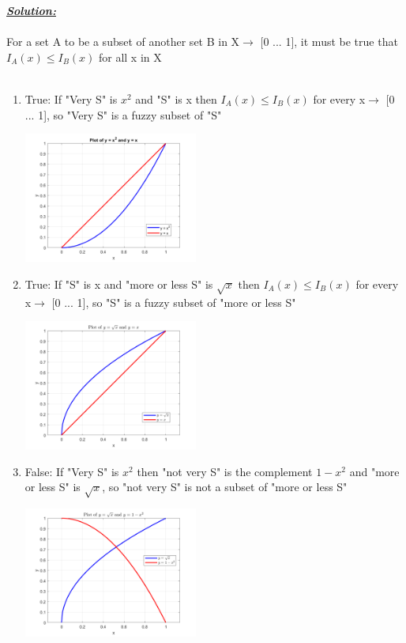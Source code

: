 \documentclass{article}
\begin{document}
\noindent \underline{\textbf{\textit{Solution:}}}
\\ \\For a set A to be a subset of another set B in X${\rightarrow}$ [0 ... 1], it must be true that  ${I_A(x) \leq I_B(x)}$  for all x in X\\ \\
\begin{enumerate}
  \item True: If "Very S" is ${x^2}$ and "S" is x then ${I_A(x) \leq I_B(x)}$ for every x${\rightarrow}$ [0 ... 1], so "Very S" is a fuzzy subset of "S"
  \\ \begin{center} \includegraphics[width=0.45\textwidth]{Problem11_1.png} \end{center}
  \item True: If "S" is x and "more or less S" is ${\sqrt{x}}$ then ${I_A(x) \leq I_B(x)}$ for every x${\rightarrow}$ [0 ... 1], so "S" is a fuzzy subset of "more or less S"
  \\ \begin{center} \includegraphics[width=0.45\textwidth]{Problem11_2.png} \end{center}
  \item False: If "Very S" is ${x^2}$ then "not very S" is the complement ${1-x^2}$ and "more or less S" is ${\sqrt{x}}$, so "not very S" is not a subset of "more or less S"
  \\ \begin{center} \includegraphics[width=0.45\textwidth]{Problem11_3.png} \end{center} 

\end{enumerate}
\end{document}
